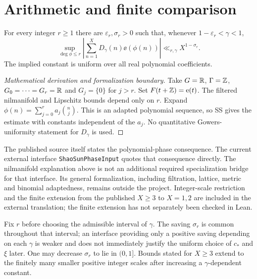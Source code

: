 \section{Arithmetic and finite comparison}
\begin{theorem}\label{t:shao-sun}
For every integer $r\geq1$ there are $\varepsilon_r,\sigma_r>0$ such that, whenever $1-\varepsilon_r<\gamma<1$,
\[
 \sup_{\deg\phi\leq r}\left|\sum_{n=1}^{X}D_\gamma(n)\ee(\phi(n))\right|
 \ll_{r,\gamma}X^{1-\sigma_r}.
\]
The implied constant is uniform over all real polynomial coefficients.
\end{theorem}
\begin{proof}[Mathematical derivation and formalization boundary]
Take $G=\mathbb R$, $\Gamma=\mathbb Z$, $G_0=\cdots=G_r=\mathbb R$ and $G_j=\{0\}$ for $j>r$. Set $F(t+\mathbb Z)=\mathrm e(t)$. The filtered nilmanifold and Lipschitz bounds depend only on $r$. Expand $\phi(n)=\sum_{j=0}^{r}a_j\binom nj$. This is an adapted polynomial sequence, so SS gives the estimate with constants independent of the $a_j$. No quantitative Gowers-uniformity statement for $D_\gamma$ is used.
\end{proof}
\ifDetailed
The published source itself states the polynomial-phase consequence. The current external interface \texttt{ShaoSunPhaseInput} quotes that consequence directly. The nilmanifold explanation above is not an additional required specialization bridge for that interface. Its general formalization, including filtration, lattice, metric and binomial adaptedness, remains outside the project. Integer-scale restriction and the finite extension from the published $X\geq3$ to $X=1,2$ are included in the external translation; the finite extension has not separately been checked in Lean.

Fix $r$ before choosing the admissible interval of $\gamma$. The saving $\sigma_r$ is common throughout that interval; an interface providing only a positive saving depending on each $\gamma$ is weaker and does not immediately justify the uniform choice of $c_*$ and $\xi$ later. One may decrease $\sigma_r$ to lie in $(0,1]$. Bounds stated for $X\geq3$ extend to the finitely many smaller positive integer scales after increasing a $\gamma$-dependent constant.
\fi

